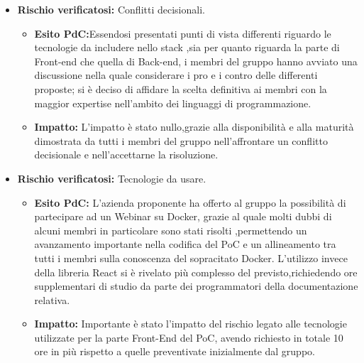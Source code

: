 \begin{itemize}
\item \textbf{Rischio verificatosi:} Conflitti decisionali.

\begin{itemize}
\item \textbf{Esito PdC:}Essendosi presentati punti di vista differenti riguardo le tecnologie da includere nello stack ,sia per quanto riguarda la parte di Front-end  che quella di Back-end, i membri del gruppo 
hanno avviato una discussione nella quale considerare i pro e i contro delle differenti proposte; si è deciso di 
affidare la scelta definitiva ai membri con la maggior expertise nell'ambito dei linguaggi di programmazione.
\item \textbf{Impatto:} L'impatto è stato nullo,grazie alla disponibilità e alla maturità dimostrata da tutti i membri del gruppo
nell'affrontare un conflitto decisionale e  nell'accettarne la risoluzione.  
\end{itemize}

\item \textbf{Rischio verificatosi:} Tecnologie da usare.
\begin{itemize}
\item \textbf{Esito PdC:} L'azienda proponente ha offerto al gruppo la possibilità di partecipare ad un Webinar
su Docker, grazie al quale molti dubbi di alcuni membri in particolare sono stati risolti ,permettendo un avanzamento 
importante nella codifica del PoC e un allineamento tra tutti i membri sulla conoscenza del sopracitato Docker.
L'utilizzo invece della libreria React si è rivelato più complesso del previsto,richiedendo ore supplementari di studio
da parte dei programmatori della documentazione relativa.\\
\item \textbf{Impatto:} Importante è stato l'impatto del rischio legato alle tecnologie utilizzate per la parte Front-End del PoC,
avendo richiesto in totale 10 ore in più rispetto a quelle preventivate inizialmente dal gruppo.\\
\end{itemize}


\end{itemize}
